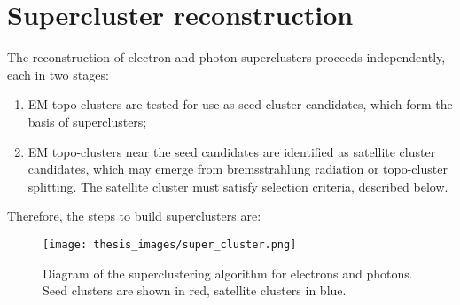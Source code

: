 \documentclass[a4paper, oneside, 11pt, openright]{book}
\begin{document}
		\section{Supercluster reconstruction}
			The reconstruction of electron and photon superclusters proceeds independently, each in two stages:
			\begin{enumerate}
				\item EM topo-clusters are tested for use as seed cluster candidates, which form the basis of superclusters;
				\item EM topo-clusters near the seed candidates are identified as satellite cluster candidates, which may emerge from bremsstrahlung radiation or topo-cluster splitting. The satellite cluster must satisfy selection criteria, described below.
			\end{enumerate}
			Therefore, the steps to build superclusters are:
			\begin{figure}
				\centering
				\texttt{[image: thesis\_images/super\_cluster.png]}
				\caption{Diagram of the superclustering algorithm for electrons and photons. Seed clusters are shown in red, satellite clusters in blue.}
				\label{fig:super_cl}
			\end{figure}
\end{document}
